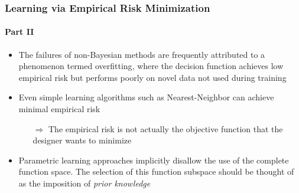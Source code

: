 \documentclass[aspectratio=169,usenames,dvipsnames]{beamer}
\begin{document}
\begin{frame}
\frametitle{Learning via Empirical Risk Minimization}
\framesubtitle{Part II}

\begin{itemize}
\item The failures of non-Bayesian methods are frequently attributed to a phenomenon termed \alert{overfitting}, where the decision function achieves low empirical risk but performs poorly on novel data not used during training
\vspace{0.5em}
\item Even simple learning algorithms such as Nearest-Neighbor \cite{devroye} can achieve minimal empirical risk
	\vspace{0.25em}
	\begin{itemize}
	\item[$\Rightarrow$] \alert{The empirical risk is not actually the objective function that the designer wants to minimize}
	\end{itemize}
\vspace{0.5em}
\item Parametric learning approaches implicitly disallow the use of the complete function space. The selection of this function subspace should be thought of as the imposition of \emph{prior knowledge}

\end{itemize}


\end{frame}
\end{document}
